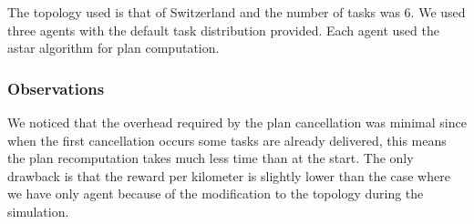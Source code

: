 \documentclass[11pt]{article}
\begin{document}
The topology used is that of Switzerland and the number of tasks was
6. We used three agents with the default task distribution
provided. Each agent used the astar algorithm for plan computation.

\subsubsection{Observations}

We noticed that the overhead required by the plan cancellation was
minimal since when the first cancellation occurs some tasks are
already delivered, this means the plan recomputation takes much less
time than at the start. The only drawback is that the reward per
kilometer is slightly lower than the case where we have only agent
because of the modification to the topology during the simulation.
\end{document}

